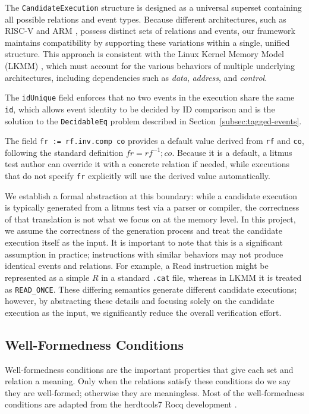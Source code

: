 The \texttt{CandidateExecution} structure is designed as a universal superset containing all possible relations and event types. Because different architectures, such as RISC-V \citep{riscv-spec} and ARM \citep{arm-arm}, possess distinct sets of relations and events, our framework maintains compatibility by supporting these variations within a single, unified structure. This approach is consistent with the Linux Kernel Memory Model (LKMM) \citep{alglave2018frightening}, which must account for the various behaviors of multiple underlying architectures, including dependencies such as \textit{data}, \textit{address}, and \textit{control}.

The \texttt{idUnique} field enforces that no two events in the execution share the same \texttt{id}, which allows event identity to be decided by ID comparison and is the solution to the \texttt{DecidableEq} problem described in Section~\ref{subsec:tagged-events}.

The field \texttt{fr := rf.inv.comp co} provides a default value derived from \texttt{rf} and \texttt{co}, following the standard definition $\mathit{fr} = \mathit{rf}^{-1} ; \mathit{co}$. Because it is a default, a litmus test author can override it with a concrete relation if needed, while executions that do not specify \texttt{fr} explicitly will use the derived value automatically.


We establish a formal abstraction at this boundary: while a candidate execution is typically generated from a litmus test via a parser or compiler, the correctness of that translation is not what we focus on at the memory level. In this project, we assume the correctness of the generation process and treat the candidate execution itself as the input. It is important to note that this is a significant assumption in practice; instructions with similar behaviors may not produce identical events and relations. For example, a Read instruction might be represented as a simple $R$ in a standard \texttt{.cat} file, whereas in LKMM it is treated as \texttt{READ\_ONCE}. These differing semantics generate different candidate executions; however, by abstracting these details and focusing solely on the candidate execution as the input, we significantly reduce the overall verification effort.

\subsection{Well-Formedness Conditions}
Well-formedness conditions are the important properties that give each set and relation a meaning. Only when the relations satisfy these conditions do we say they are well-formed; otherwise they are meaningless. Most of the well-formedness conditions are adapted from the herdtools7 Rocq development \citep{10.1145/2627752, 10.1145/3458926ArmedCat}.



